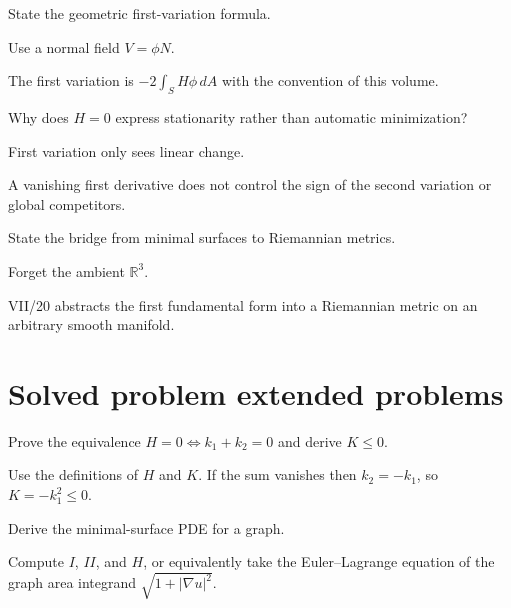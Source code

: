 \begin{exercise}\label{exr:vii19-22}
State the geometric first-variation formula.
\end{exercise}
\begin{hint}
Use a normal field \(V=\phi N\).
\end{hint}
\begin{solution}
The first variation is \(-2\int_S H\phi\,dA\) with the convention of this volume.
\end{solution}

\begin{exercise}\label{exr:vii19-23}
Why does \(H=0\) express stationarity rather than automatic minimization?
\end{exercise}
\begin{hint}
First variation only sees linear change.
\end{hint}
\begin{solution}
A vanishing first derivative does not control the sign of the second variation or global competitors.
\end{solution}

\begin{exercise}\label{exr:vii19-24}
State the bridge from minimal surfaces to Riemannian metrics.
\end{exercise}
\begin{hint}
Forget the ambient \(\mathbb R^3\).
\end{hint}
\begin{solution}
VII/20 abstracts the first fundamental form into a Riemannian metric on an arbitrary smooth manifold.
\end{solution}

\section{Solved problem extended problems}

\begin{problem}\label{prob:vii19-01}
Prove the equivalence \(H=0\iff k_1+k_2=0\) and derive \(K\le0\).
\end{problem}
\begin{solution}
Use the definitions of \(H\) and \(K\). If the sum vanishes then \(k_2=-k_1\), so \(K=-k_1^2\le0\).
\end{solution}

\begin{problem}\label{prob:vii19-02}
Derive the minimal-surface PDE for a graph.
\end{problem}
\begin{solution}
Compute \(I\), \(II\), and \(H\), or equivalently take the Euler--Lagrange equation of the graph area integrand \(\sqrt{1+|\nabla u|^2}\).
\end{solution}


